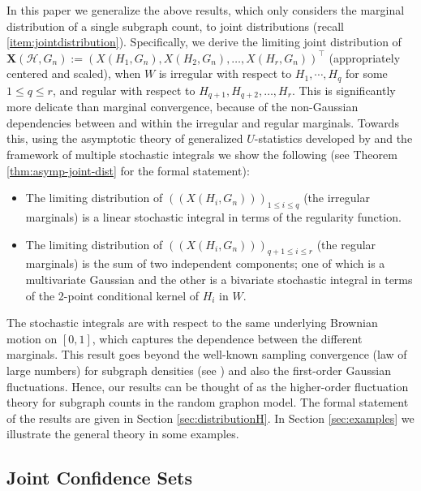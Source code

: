 \documentclass[11pt,reqno]{amsart}
\numberwithin{equation}{section}
\newcommand{\cH}{{\mathcal H}}
\theoremstyle{definition}
\begin{document}
In this paper we generalize the above results, which only considers the marginal distribution of a single subgraph count, to joint distributions (recall \ref{item:jointdistribution}). Specifically, we derive the limiting joint distribution of $\bm X(\cH, G_n) := (X(H_1, G_n), X(H_2, G_n), \ldots, X(H_r, G_n))^\top$ (appropriately centered and scaled), when $W$ is irregular with respect to $H_{1},\cdots, H_{q}$ for some $1\leq q \leq r$, and regular with respect to $H_{q+1}, H_{q+2}, \ldots, H_r$.  This is significantly more delicate than marginal convergence, because of the non-Gaussian dependencies between and within the irregular  and regular marginals. Towards this, using the asymptotic theory of generalized $U$-statistics developed by \citet{janson1991asymptotic} and the framework of multiple stochastic integrals we show the following (see Theorem \ref{thm:asymp-joint-dist} for the formal statement):  
\begin{itemize}

\item The limiting distribution of $((X(H_i, G_n)))_{1 \leq i \leq q}$ (the irregular marginals) is a linear stochastic integral in terms of the regularity function. 

\item The limiting distribution of $((X(H_i, G_n)))_{q+1 \leq i \leq r}$ (the regular marginals) is the sum of two independent components; one of which is a multivariate Gaussian and the other is a bivariate stochastic integral in terms of the 2-point conditional kernel of $H_i$ in $W$. 
\end{itemize}
The stochastic integrals are with respect to the same underlying Brownian motion on $[0, 1]$, which captures the dependence between the different marginals. This result goes beyond the well-known sampling convergence (law of large numbers) for subgraph densities (see \cite[Corollary 10.4]{lovasz2012large}) and also the first-order  Gaussian fluctuations. Hence, our results can be thought of as the higher-order fluctuation theory for subgraph counts in the random graphon model. 
The formal statement of the results are given in Section \ref{sec:distributionH}. In Section \ref{sec:examples} we illustrate the general theory in some examples. 


\subsection{Joint Confidence Sets}
\end{document}
